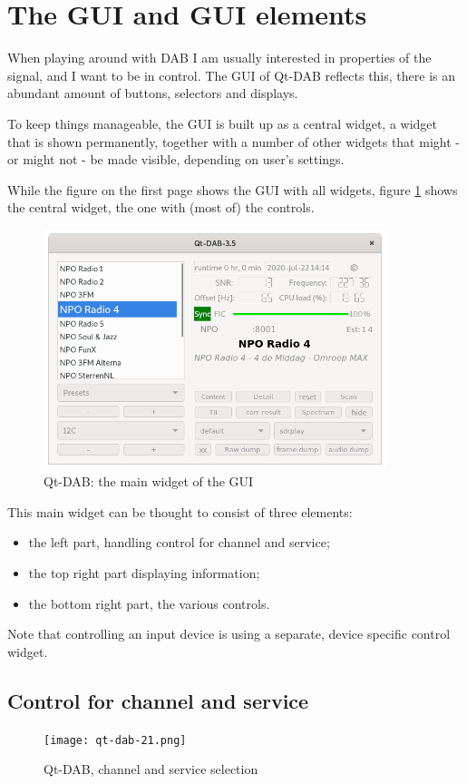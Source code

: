 \documentclass[12pt]{article}
\begin{document}
\section{The GUI and GUI elements}
When playing around with DAB I am usually interested in properties
of the signal, and I want to be in control.
The GUI of Qt-DAB reflects this, there is an abundant amount of buttons,
selectors and displays.
\par
To keep things manageable, the GUI is built up as a central widget, a widget
that is shown permanently, together with a number of other widgets that might -
or might not - be made visible, depending on user's settings.
\par
While the figure on the first page shows the GUI with all
widgets,  figure \ref{figure:main-widget} shows the central widget, the
one with (most of) the controls.
\begin{figure}[htp]
\centering
\includegraphics[width=100mm]{qt-dab-2.png}
\caption{Qt-DAB: the main widget of the GUI}
\label{figure:main-widget}
\end{figure}
\par
This main widget can be thought to consist of three elements:
\begin{itemize}
\item the left part, handling control for channel and service;
\item the top right part displaying information;
\item the bottom right part, the various controls.
\end{itemize}
Note that controlling an input device is using a  separate, device specific
control widget.
\subsection{Control for channel and service}
\begin{figure}[htp]
\centering
\texttt{[image: qt-dab-21.png]}
\caption{Qt-DAB, channel and service selection}
\label{figure:left-part}
\end{figure}
\end{document}
